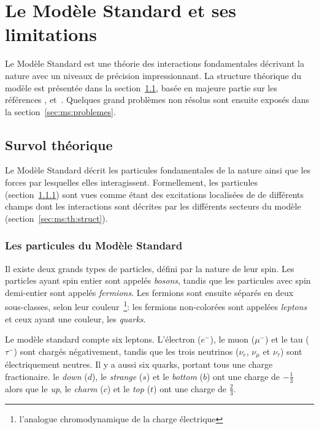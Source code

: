 \chapter{Le Modèle Standard et ses limitations}
\label{sec:ms}

Le Modèle Standard est une théorie des interactions fondamentales
décrivant la nature avec un niveaux de précision impressionnant.  La
structure théorique du modèle est présentée dans la
section~\ref{sec:ms:th}, basée en majeure partie sur les références
\cite{olive_ewk_2014}, \cite{olive_qcd_2014}
et~\cite{thomson_modern_2013}. Quelques grand problèmes non résolus
sont ensuite exposés dans la section~\ref{sec:ms:problemes}.

\section{Survol théorique}
\label{sec:ms:th}

Le Modèle Standard décrit les particules fondamentales de la nature
ainsi que les forces par lesquelles elles interagissent. Formellement,
les particules (section~\ref{sec:ms:th:particules}) sont vues comme
étant des excitations localisées de de différents champs dont les
interactions sont décrites par les différents secteurs
du modèle (section~\ref{sec:ms:th:struct}).

\subsection{Les particules du Modèle Standard}
\label{sec:ms:th:particules}

Il existe deux grands types de particles, défini par la nature
de leur spin. Les particles ayant spin entier sont appelés
\emph{bosons}, tandis que les particules avec spin demi-entier sont
appelés \emph{fermions}. Les fermions sont ensuite séparés en deux
sous-classes, selon leur couleur~\footnote{l'analogue chromodynamique
  de la charge électrique}: les fermions non-colorées sont appelées
\emph{leptons} et ceux ayant une couleur, les \emph{quarks}. 

Le modèle standard compte six leptons. L'électron ($e^-$), le muon
($\mu^-$) et le tau ($\tau^-$) sont chargés négativement, tandis que
les trois neutrinos ($\nu_e$, $\nu_\mu$ et $\nu_\tau$) sont
électriquement neutres. Il y a aussi six quarks, portant tous une
charge fractionaire. le \emph{down} ($d$), le \emph{strange} ($s$) et
le \emph{bottom} ($b$) ont une charge de $-\frac{1}{3}$ alors que le
\emph{up}, le \emph{charm} ($c$) et le \emph{top} ($t$) ont une charge
de $\frac{2}{3}$.

